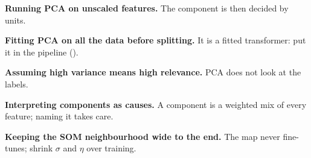 \begin{pitfall}
\begin{tight}
  \item \textbf{Running PCA on unscaled features.} The component is then decided by
        units.
  \item \textbf{Fitting PCA on all the data before splitting.} It is a fitted
        transformer: put it in the pipeline ().
  \item \textbf{Assuming high variance means high relevance.} PCA does not look at
        the labels.
  \item \textbf{Interpreting components as causes.} A component is a weighted mix
        of every feature; naming it takes care.
  \item \textbf{Keeping the SOM neighbourhood wide to the end.} The map never
        fine-tunes; shrink $\sigma$ and $\eta$ over training.
\end{tight}
\end{pitfall}

